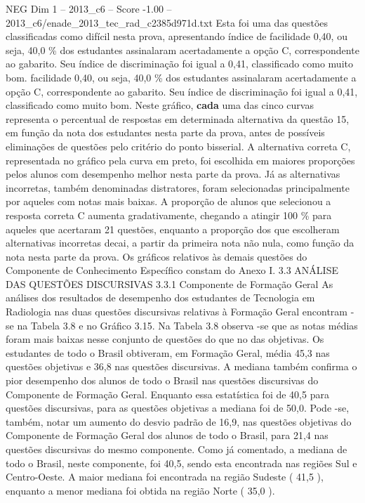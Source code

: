 \begin{textsample}{NEG Dim 1 – 2013\_c6 – Score -1.00 – 2013\_c6/enade\_2013\_tec\_rad\_c2385d971d.txt}
Esta foi uma das questões classificadas como difícil nesta prova, apresentando índice de facilidade 0,40, ou seja, 40,0 \% dos estudantes assinalaram acertadamente a opção C, correspondente ao gabarito.
Seu índice de discriminação foi igual a 0,41, classificado como muito bom. facilidade 0,40, ou seja, 40,0 \% dos estudantes assinalaram acertadamente a opção C, correspondente ao gabarito.
Seu índice de discriminação foi igual a 0,41, classificado como muito bom.
Neste gráfico, \textbf{cada} uma das cinco curvas representa o percentual de respostas em determinada alternativa da questão 15, em função da nota dos estudantes nesta parte da prova, antes de possíveis eliminações de questões pelo critério do ponto bisserial.
A alternativa correta C, representada no gráfico pela curva em preto, foi escolhida em maiores proporções pelos alunos com desempenho melhor nesta parte da prova.
Já as alternativas incorretas, também denominadas distratores, foram selecionadas principalmente por aqueles com notas mais baixas.
A proporção de alunos que selecionou a resposta correta C aumenta gradativamente, chegando a atingir 100 \% para aqueles que acertaram 21 questões, enquanto a proporção dos que escolheram alternativas incorretas decai, a partir da primeira nota não nula, como função da nota nesta parte da prova.
Os gráficos relativos às demais questões do Componente de Conhecimento Específico constam do Anexo I. 3.3 ANÁLISE DAS QUESTÕES DISCURSIVAS 3.3.1 Componente de Formação Geral As análises dos resultados de desempenho dos estudantes de Tecnologia em Radiologia nas duas questões discursivas relativas à Formação Geral encontram -se na Tabela 3.8 e no Gráfico 3.15.
Na Tabela 3.8 observa -se que as notas médias foram mais baixas nesse conjunto de questões do que no das objetivas.
Os estudantes de todo o Brasil obtiveram, em Formação Geral, média 45,3 nas questões objetivas e 36,8 nas questões discursivas.
A mediana também confirma o pior desempenho dos alunos de todo o Brasil nas questões discursivas do Componente de Formação Geral.
Enquanto essa estatística foi de 40,5 para questões discursivas, para as questões objetivas a mediana foi de 50,0.
Pode -se, também, notar um aumento do desvio padrão de 16,9, nas questões objetivas do Componente de Formação Geral dos alunos de todo o Brasil, para 21,4 nas questões discursivas do mesmo componente.
Como já comentado, a mediana de todo o Brasil, neste componente, foi 40,5, sendo esta encontrada nas regiões Sul e Centro-Oeste.
A maior mediana foi encontrada na região Sudeste ( 41,5 ), enquanto a menor mediana foi obtida na região Norte ( 35,0 ).

\end{textsample}
